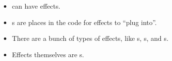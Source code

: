 

\begin{tldr}
	\begin{itemize}
		\item{ can have effects.}
		\item{s are places in the code for effects to ``plug into''.}
		\item{There are a bunch of types of effects, like s, s, and s.}
		\item{Effects themselves are s.}
	\end{itemize}
\end{tldr}



\newcommand{\SubItem}[1]{\begin{itemize}\item{#1}\end{itemize}}

